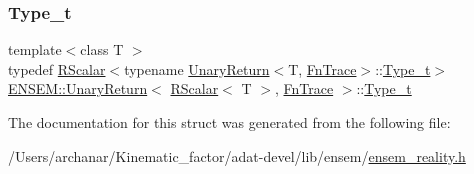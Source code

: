 \mbox{\label{structENSEM_1_1UnaryReturn_3_01RScalar_3_01T_01_4_00_01FnTrace_01_4_a1fbf2ac97cda49c4f5347aa1df4559aa}} 
\subsubsection{\texorpdfstring{Type\_t}{Type\_t}\hspace{0.1cm}{\footnotesize\ttfamily [3/3]}}
{\footnotesize\ttfamily template$<$class T $>$ \\
typedef \mbox{\hyperlink{classENSEM_1_1RScalar}{R\+Scalar}}$<$typename \mbox{\hyperlink{structENSEM_1_1UnaryReturn}{Unary\+Return}}$<$T, \mbox{\hyperlink{structENSEM_1_1FnTrace}{Fn\+Trace}}$>$\+::\mbox{\hyperlink{structENSEM_1_1UnaryReturn_3_01RScalar_3_01T_01_4_00_01FnTrace_01_4_a1fbf2ac97cda49c4f5347aa1df4559aa}{Type\+\_\+t}}$>$ \mbox{\hyperlink{structENSEM_1_1UnaryReturn}{E\+N\+S\+E\+M\+::\+Unary\+Return}}$<$ \mbox{\hyperlink{classENSEM_1_1RScalar}{R\+Scalar}}$<$ T $>$, \mbox{\hyperlink{structENSEM_1_1FnTrace}{Fn\+Trace}} $>$\+::\mbox{\hyperlink{structENSEM_1_1UnaryReturn_3_01RScalar_3_01T_01_4_00_01FnTrace_01_4_a1fbf2ac97cda49c4f5347aa1df4559aa}{Type\+\_\+t}}}



The documentation for this struct was generated from the following file\+:\begin{DoxyCompactItemize}
\item 
/\+Users/archanar/\+Kinematic\+\_\+factor/adat-\/devel/lib/ensem/\mbox{\hyperlink{adat-devel_2lib_2ensem_2ensem__reality_8h}{ensem\+\_\+reality.\+h}}\end{DoxyCompactItemize}
